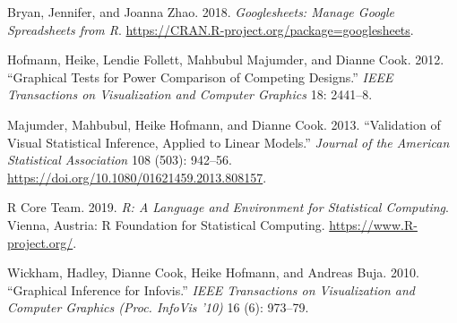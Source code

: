 \documentclass[conference,final,]{IEEEtran}
\begin{document}
\leavevmode\hypertarget{ref-sheets}{}%
Bryan, Jennifer, and Joanna Zhao. 2018. \emph{Googlesheets: Manage
Google Spreadsheets from R}.
\url{https://CRAN.R-project.org/package=googlesheets}.

\leavevmode\hypertarget{ref-GTPCCD}{}%
Hofmann, Heike, Lendie Follett, Mahbubul Majumder, and Dianne Cook.
2012. ``Graphical Tests for Power Comparison of Competing Designs.''
\emph{IEEE Transactions on Visualization and Computer Graphics} 18:
2441--8.

\leavevmode\hypertarget{ref-VVSIALM}{}%
Majumder, Mahbubul, Heike Hofmann, and Dianne Cook. 2013. ``Validation
of Visual Statistical Inference, Applied to Linear Models.''
\emph{Journal of the American Statistical Association} 108 (503):
942--56. \url{https://doi.org/10.1080/01621459.2013.808157}.

\leavevmode\hypertarget{ref-RCore}{}%
R Core Team. 2019. \emph{R: A Language and Environment for Statistical
Computing}. Vienna, Austria: R Foundation for Statistical Computing.
\url{https://www.R-project.org/}.

\leavevmode\hypertarget{ref-GIIV}{}%
Wickham, Hadley, Dianne Cook, Heike Hofmann, and Andreas Buja. 2010.
``Graphical Inference for Infovis.'' \emph{IEEE Transactions on
Visualization and Computer Graphics (Proc. InfoVis '10)} 16 (6):
973--79.
\end{document}

